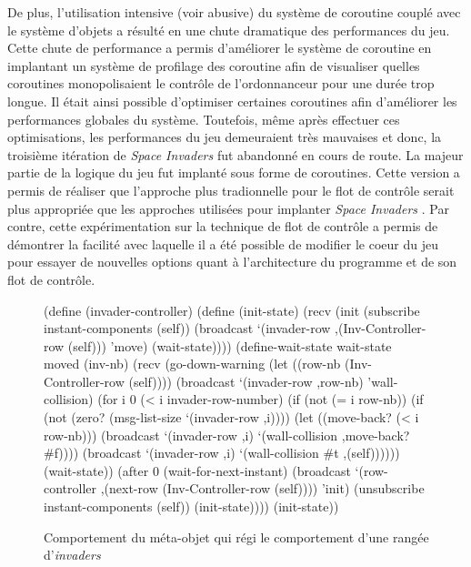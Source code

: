 \documentclass[12pt,twoside,letterpaper,francais]{book}
\newcommand{\si}{{\textit{Space Invaders }}}
\newcommand{\scheme}[1]{\selectlanguage{english}{\tt #1}\selectlanguage{french}}
\begin{document}
De plus, l'utilisation intensive (voir abusive) du système de
coroutine couplé avec le système d'objets a résulté en une chute
dramatique des performances du jeu. Cette chute de performance a
permis d'améliorer le système de coroutine en implantant un système de
profilage des coroutine afin de visualiser quelles coroutines
monopolisaient le contrôle de l'ordonnanceur pour une durée trop
longue. Il était ainsi possible d'optimiser certaines coroutines afin
d'améliorer les performances globales du système. Toutefois, même
après effectuer ces optimisations, les performances du jeu demeuraient
très mauvaises et donc, la troisième itération de \si fut abandonné en
cours de route. La majeur partie de la logique du jeu fut implanté
sous forme de coroutines. Cette version a permis de réaliser que
l'approche plus tradionnelle pour le flot de contrôle serait plus
appropriée que les approches utilisées pour implanter \si. Par contre,
cette expérimentation sur la technique de flot de contrôle a permis de
démontrer la facilité avec laquelle il a été possible de modifier le
coeur du jeu pour essayer de nouvelles options quant à l'architecture
du programme et de son flot de contrôle.

\begin{figure}[htb!]
  \begin{schemecode}
(define (invader-controller)
  (define (init-state)
    (recv
     (init
      (subscribe instant-components (self))
      (broadcast `(invader-row ,(Inv-Controller-row (self)))
                 'move)
      (wait-state))))
  (define-wait-state wait-state moved (inv-nb)
    (recv
     (go-down-warning
      (let ((row-nb (Inv-Controller-row (self))))
        (broadcast `(invader-row ,row-nb) 'wall-collision)
        (for i 0 (< i invader-row-number)
             (if (not (= i row-nb))
                 (if (not (zero? (msg-list-size `(invader-row ,i))))
                     (let ((move-back? (< i row-nb)))
                       (broadcast `(invader-row ,i)
                                  `(wall-collision ,move-back? \#f))))
                 (broadcast `(invader-row ,i)
                            `(wall-collision  \#t ,(self))))))
      (wait-state))
     (after 0
            (wait-for-next-instant)
            (broadcast `(row-controller
                         ,(next-row (Inv-Controller-row (self))))
                       'init)
            (unsubscribe instant-components (self))
            (init-state))))
  (init-state))
  \end{schemecode}
  \caption{Comportement du méta-objet \scheme{invader-controller} qui
    régi le comportement d'une rangée d'\textit{invaders}}
  \label{Exp:inv-cnt}
\end{figure}
\end{document}
